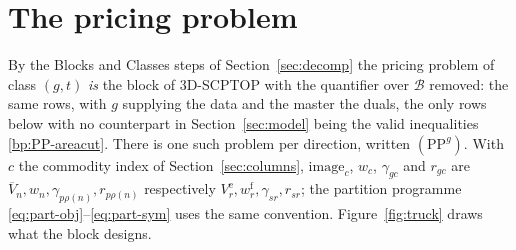 \section{The pricing problem}
\label{sec:pricing}

By the Blocks and Classes steps of Section~\ref{sec:decomp} the
pricing problem of class $(g,t)$ \emph{is} the block of 3D-SCPTOP with
the quantifier over $\mathcal{B}$ removed: the same rows, with $g$
supplying the data and the master the duals, the only rows below with
no counterpart in Section~\ref{sec:model} being the valid inequalities
\eqref{bp:PP-areacut}. There is one such problem per direction, written
$(\mathrm{PP}^{g})$. With $c$ the commodity index of
Section~\ref{sec:columns}, $\mathrm{image}_{c}$, $w_{c}$,
$\gamma_{gc}$ and $r_{gc}$ are
$\overline{V}_{n},w_{n},\gamma_{p\rho(n)},r_{p\rho(n)}$ respectively
$V^{\mathrm{e}}_{r},w^{\mathrm{f}}_{r},\gamma_{sr},r_{sr}$; the partition
programme \eqref{eq:part-obj}--\eqref{eq:part-sym} uses the same
convention. Figure~\ref{fig:truck} draws what the block designs.

